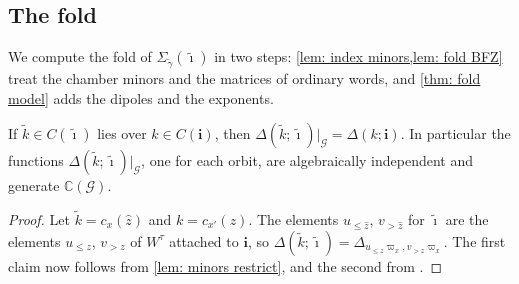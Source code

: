 \documentclass[a4paper]{amsart}
\numberwithin{equation}{section}
\theoremstyle{definition}
\theoremstyle{remark}
\newcommand{\bbC}{\mathbb{C}}
\newcommand{\mcG}{\mathcal{G}}
\newcommand{\bfi}{\mathbf{i}}
\newcommand{\tbfi}{\widetilde{\boldsymbol{\imath}}}
\newcommand{\tg}{\widetilde{\gamma}}
\begin{document}
\subsection{The fold}
We compute the fold of $\Sigma_{\tg}(\tbfi)$ in two steps: \cref{lem: index minors,lem: fold BFZ} treat the chamber minors and the matrices of ordinary words, and \cref{thm: fold model} adds the dipoles and the exponents.

\begin{lemma}
  \label{lem: index minors}
  If $\widetilde{k}\in C(\tbfi)$ lies over $k\in C(\bfi)$, then $\Delta(\widetilde{k};\tbfi)|_\mcG=\Delta(k;\bfi)$.
  In particular the functions $\Delta(\widetilde{k};\tbfi)|_\mcG$, one for each orbit, are algebraically independent and generate $\bbC(\mcG)$.
\end{lemma}
\begin{proof}
  Let $\widetilde{k}=c_x(\widehat z)$ and $k=c_{x'}(z)$.
  The elements $u_{\le\widehat z}$, $v_{>\widehat z}$ for $\tbfi$ are the elements $u_{\le z}$, $v_{>z}$ of $W^\tau$ attached to $\bfi$, so $\Delta(\widetilde{k};\tbfi)=\Delta_{u_{\le z}\varpi_x,v_{>z}\varpi_x}$.
  The first claim now follows from \cref{lem: minors restrict}, and the second from \cite[Theorem~2.10]{BFZ05}.
\end{proof}
\end{document}

